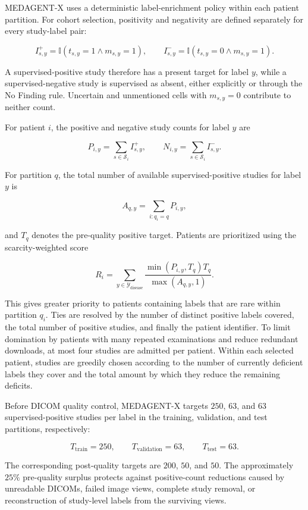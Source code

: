 MEDAGENT-X uses a deterministic label-enrichment policy within each patient partition. For cohort selection, positivity and negativity are defined separately for every study-label pair:

\[
I^{+}_{s,y}=\mathbb{I}(t_{s,y}=1\land m_{s,y}=1),
\qquad
I^{-}_{s,y}=\mathbb{I}(t_{s,y}=0\land m_{s,y}=1).
\]

A supervised-positive study therefore has a present target for label $y$, while a supervised-negative study is supervised as absent, either explicitly or through the No Finding rule. Uncertain and unmentioned cells with $m_{s,y}=0$ contribute to neither count.

For patient $i$, the positive and negative study counts for label $y$ are

\[
P_{i,y}=\sum_{s\in\mathcal{S}_i}I^{+}_{s,y},
\qquad
N_{i,y}=\sum_{s\in\mathcal{S}_i}I^{-}_{s,y}.
\]

For partition $q$, the total number of available supervised-positive studies for label $y$ is

\[
A_{q,y}=\sum_{i:q_i=q}P_{i,y},
\]

and $T_q$ denotes the pre-quality positive target. Patients are prioritized using the scarcity-weighted score

\[
R_i
=
\sum_{y\in\mathcal{Y}_{\mathrm{disease}}}
\frac{\min(P_{i,y},T_q)T_q}{\max(A_{q,y},1)}.
\]

This gives greater priority to patients containing labels that are rare within partition $q_i$. Ties are resolved by the number of distinct positive labels covered, the total number of positive studies, and finally the patient identifier. To limit domination by patients with many repeated examinations and reduce redundant downloads, at most four studies are admitted per patient. Within each selected patient, studies are greedily chosen according to the number of currently deficient labels they cover and the total amount by which they reduce the remaining deficits.

Before DICOM quality control, MEDAGENT-X targets $250$, $63$, and $63$ supervised-positive studies per label in the training, validation, and test partitions, respectively:

\[
T_{\mathrm{train}}=250,
\qquad
T_{\mathrm{validation}}=63,
\qquad
T_{\mathrm{test}}=63.
\]

The corresponding post-quality targets are $200$, $50$, and $50$. The approximately $25\%$ pre-quality surplus protects against positive-count reductions caused by unreadable DICOMs, failed image views, complete study removal, or reconstruction of study-level labels from the surviving views.

